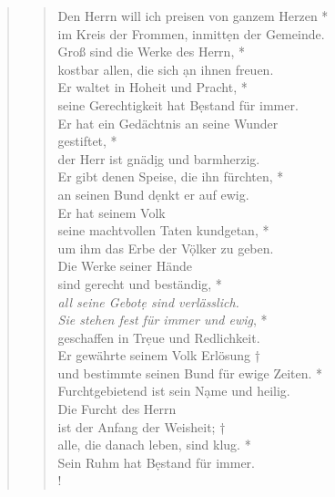 \medskip


\begin{quote}
\begin{verse}

Den Herrn will ich preisen von ganzem Herzen *\\
im Kreis der Frommen, inmitt\d en der Gemeinde.\\
\vin Groß sind die Werke des Herrn, *\\
\vin kostbar allen, die sich \d an ihnen freuen.\\
Er waltet in Hoheit und Pracht, *\\
seine Gerechtigkeit hat B\d estand für immer.\\
\vin Er hat ein Gedächtnis an seine Wunder\\ 
\vin gestiftet, *\\
\vin der Herr ist gnäd\d ig und barmherzig.\\
Er gibt denen Speise, die ihn fürchten, *\\
an seinen Bund d\d enkt er auf ewig.\\
\vin Er hat seinem Volk\\
\vin seine machtvollen Taten kundgetan, *\\
\vin um ihm das Erbe der V\d ölker zu geben. \\
Die Werke seiner Hände\\
sind gerecht und beständig, *\\
\textit{all seine Gebot\d e sind verlässlich.\\
\vin Sie stehen fest für immer und ewig}, *\\
\vin geschaffen in Tr\d eue und Redlichkeit.\\
Er gewährte seinem Volk Erlösung †\\
und bestimmte seinen Bund für ewige Zeiten. *\\
Furchtgebietend ist sein N\d ame und heilig. \\
\vin Die Furcht des Herrn\\ 
\vin ist der Anfang der Weisheit; †\\
\vin alle, die danach leben, sind klug. *\\
\vin Sein Ruhm hat B\d estand für immer.\\!

\end{verse}
 
\end{quote}


\vspace{0.6cm}
\def\greinitialformat#1{{\fontsize{40}{40}\selectfont #1}}
\gresetfirstlineaboveinitial{\small \textcolor{red}{Ps 112}}{}
\setaboveinitialseparation{0.72mm}

